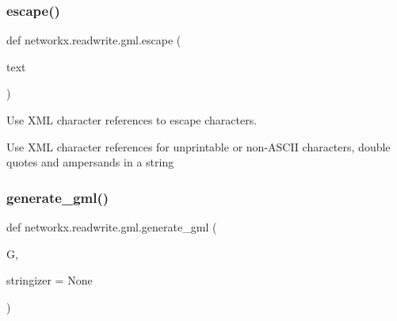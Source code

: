 \subsubsection{\texorpdfstring{escape()}{escape()}}
{\footnotesize\ttfamily def networkx.\+readwrite.\+gml.\+escape (\begin{DoxyParamCaption}\item[{}]{text }\end{DoxyParamCaption})}

\begin{DoxyVerb}Use XML character references to escape characters.

Use XML character references for unprintable or non-ASCII
characters, double quotes and ampersands in a string
\end{DoxyVerb}
 \mbox{\label{namespacenetworkx_1_1readwrite_1_1gml_a7212443bc0093c077bcba29a564434d9}} 
\subsubsection{\texorpdfstring{generate\+\_\+gml()}{generate\_gml()}}
{\footnotesize\ttfamily def networkx.\+readwrite.\+gml.\+generate\+\_\+gml (\begin{DoxyParamCaption}\item[{}]{G,  }\item[{}]{stringizer = {\ttfamily None} }\end{DoxyParamCaption})}

